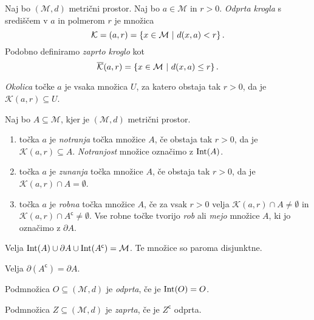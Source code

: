 \documentclass[12pt, a4paper]{article}
\begin{document}
\begin{definicija}
Naj bo $(\mathcal{M},d)$ metrični prostor. Naj bo $a\in \mathcal{M}$ in $r>0$. \emph{Odprta krogla} s središčem v $a$ in polmerom $r$ je množica
\[
\mathcal{K}=(a,r)=\left\{x\in \mathcal{M}~\middle\vert~d(x,a)<r\right\}.
\]
Podobno definiramo \emph{zaprto kroglo} kot
\[
\overline{\mathcal{K}}(a,r)=\left\{x\in \mathcal{M}~\middle\vert~d(x,a)\leq r\right\}.
\]
\end{definicija}

\begin{definicija}
\emph{Okolica} točke $a$ je vsaka množica $U$, za katero obstaja tak $r>0$, da je $\mathcal{K}(a,r)\subseteq U$.
\end{definicija}

\begin{definicija}
Naj bo $A\subseteq \mathcal{M}$, kjer je $(\mathcal{M},d)$ metrični prostor.

\begin{enumerate}[label=\roman*)]
\item točka $a$ je \emph{notranja} točka množice $A$, če obstaja tak $r>0$, da je $\mathcal{K}(a,r)\subseteq A$. \emph{Notranjost} množice označimo z $\operatorname{Int}(A)$.
\item točka $a$ je \emph{zunanja} točka množice $A$, če obstaja tak $r>0$, da je $\mathcal{K}(a,r)\cap A=\emptyset$.
\item točka $a$ je \emph{robna} točka množice $A$, če za vsak $r>0$ velja $\mathcal{K}(a,r)\cap A\ne\emptyset$ in  $\mathcal{K}(a,r)\cap A^\mathsf{c}\ne\emptyset$. Vse robne točke tvorijo \emph{rob} ali \emph{mejo} množice $A$, ki jo označimo z $\partial A$.
\end{enumerate}
\end{definicija}

\begin{opomba}
Velja $\operatorname{Int}(A)\cup\partial A\cup\operatorname{Int}(A^\mathsf{c})=\mathcal{M}$. Te množice so paroma disjunktne.
\end{opomba}

\begin{opomba}
Velja $\partial(A^\mathsf{c})=\partial A$.
\end{opomba}

\begin{definicija}
Podmnožica $O\subseteq(\mathcal{M},d)$ je \emph{odprta}, če je $\operatorname{Int}(O)=O$.
\end{definicija}

\begin{definicija}
Podmnožica $Z\subseteq(\mathcal{M},d)$ je \emph{zaprta}, če je $Z^\mathsf{c}$ odprta.
\end{definicija}
\end{document}
